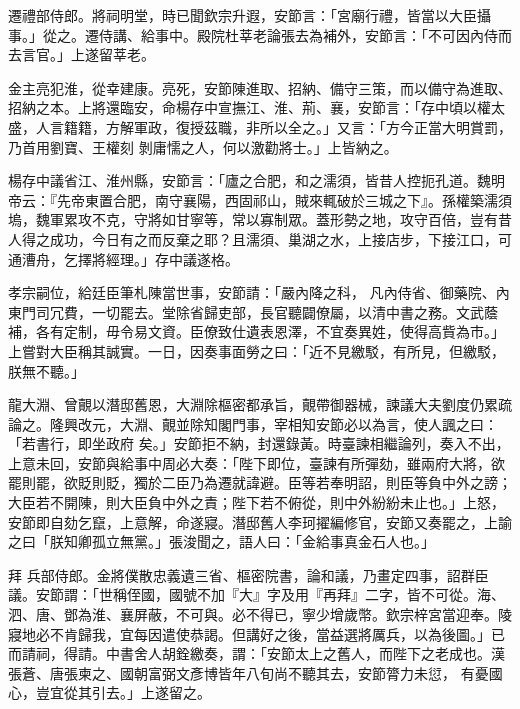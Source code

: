 \begin{pinyinscope}
 遷禮部侍郎。將祠明堂，時已聞欽宗升遐，安節言：「宮廟行禮，皆當以大臣攝事。」從之。遷侍講、給事中。殿院杜莘老論張去為補外，安節言：「不可因內侍而去言官。」上遂留莘老。



 金主亮犯淮，從幸建康。亮死，安節陳進取、招納、備守三策，而以備守為進取、招納之本。上將還臨安，命楊存中宣撫江、淮、荊、襄，安節言：「存中頃以權太盛，人言籍籍，方解軍政，復授茲職，非所以全之。」又言：「方今正當大明賞罰，乃首用劉寶、王權刻
 剝庸懦之人，何以激勸將士。」上皆納之。



 楊存中議省江、淮州縣，安節言：「廬之合肥，和之濡須，皆昔人控扼孔道。魏明帝云：『先帝東置合肥，南守襄陽，西固祁山，賊來輒破於三城之下』。孫權築濡須塢，魏軍累攻不克，守將如甘寧等，常以寡制眾。蓋形勢之地，攻守百倍，豈有昔人得之成功，今日有之而反棄之耶？且濡須、巢湖之水，上接店步，下接江口，可通漕舟，乞擇將經理。」存中議遂格。



 孝宗嗣位，給廷臣筆札陳當世事，安節請：「嚴內降之科，
 凡內侍省、御藥院、內東門司冗費，一切罷去。堂除省歸吏部，長官聽闢僚屬，以清中書之務。文武蔭補，各有定制，毋令易文資。臣僚致仕遺表恩澤，不宜奏異姓，使得高貲為市。」上嘗對大臣稱其誠實。一日，因奏事面勞之曰：「近不見繳駁，有所見，但繳駁，朕無不聽。」



 龍大淵、曾覿以潛邸舊恩，大淵除樞密都承旨，覿帶御器械，諫議大夫劉度仍累疏論之。隆興改元，大淵、覿並除知閣門事，宰相知安節必以為言，使人諷之曰：「若書行，即坐政府
 矣。」安節拒不納，封還錄黃。時臺諫相繼論列，奏入不出，上意未回，安節與給事中周必大奏：「陛下即位，臺諫有所彈劾，雖兩府大將，欲罷則罷，欲貶則貶，獨於二臣乃為遷就諱避。臣等若奉明詔，則臣等負中外之謗；大臣若不開陳，則大臣負中外之責；陛下若不俯從，則中外紛紛未止也。」上怒，安節即自劾乞竄，上意解，命遂寢。潛邸舊人李珂擢編修官，安節又奏罷之，上諭之曰「朕知卿孤立無黨。」張浚聞之，語人曰：「金給事真金石人也。」



 拜
 兵部侍郎。金將僕散忠義遺三省、樞密院書，論和議，乃畫定四事，詔群臣議。安節謂：「世稱侄國，國號不加『大』字及用『再拜』二字，皆不可從。海、泗、唐、鄧為淮、襄屏蔽，不可與。必不得已，寧少增歲幣。欽宗梓宮當迎奉。陵寢地必不肯歸我，宜每因遣使恭謁。但講好之後，當益選將厲兵，以為後圖。」已而請祠，得請。中書舍人胡銓繳奏，謂：「安節太上之舊人，而陛下之老成也。漢張蒼、唐張柬之、國朝富弼文彥博皆年八旬尚不聽其去，安節膂力未愆，
 有憂國心，豈宜從其引去。」上遂留之。




\end{pinyinscope}
